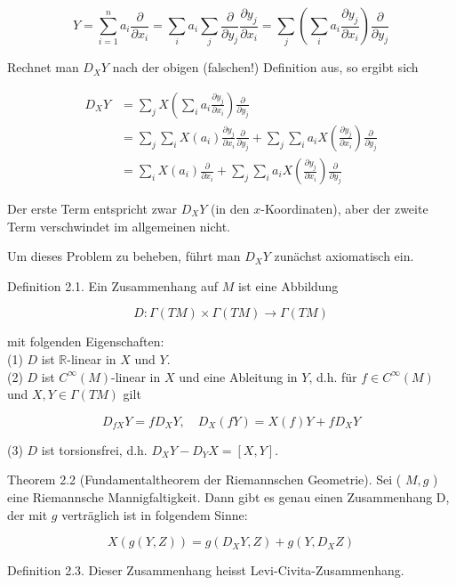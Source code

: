 \documentclass[10pt]{article}
\begin{document}
$$
Y=\sum_{i=1}^{n} a_{i} \frac{\partial}{\partial x_{i}}=\sum_{i} a_{i} \sum_{j} \frac{\partial}{\partial y_{j}} \frac{\partial y_{j}}{\partial x_{i}}=\sum_{j}\left(\sum_{i} a_{i} \frac{\partial y_{j}}{\partial x_{i}}\right) \frac{\partial}{\partial y_{j}}
$$

Rechnet man $D_{X} Y$ nach der obigen (falschen!) Definition aus, so ergibt sich

$$
\begin{aligned}
D_{X} Y & =\sum_{j} X\left(\sum_{i} a_{i} \frac{\partial y_{j}}{\partial x_{i}}\right) \frac{\partial}{\partial y_{j}} \\
& =\sum_{j} \sum_{i} X\left(a_{i}\right) \frac{\partial y_{j}}{\partial x_{i}} \frac{\partial}{\partial y_{j}}+\sum_{j} \sum_{i} a_{i} X\left(\frac{\partial y_{j}}{\partial x_{i}}\right) \frac{\partial}{\partial y_{j}} \\
& =\sum_{i} X\left(a_{i}\right) \frac{\partial}{\partial x_{i}}+\sum_{j} \sum_{i} a_{i} X\left(\frac{\partial y_{j}}{\partial x_{i}}\right) \frac{\partial}{\partial y_{j}}
\end{aligned}
$$

Der erste Term entspricht zwar $D_{X} Y$ (in den $x$-Koordinaten), aber der zweite Term verschwindet im allgemeinen nicht.

Um dieses Problem zu beheben, führt man $D_{X} Y$ zunächst axiomatisch ein.

Definition 2.1. Ein Zusammenhang auf $M$ ist eine Abbildung

$$
D: \Gamma(T M) \times \Gamma(T M) \rightarrow \Gamma(T M)
$$

mit folgenden Eigenschaften:\\
(1) $D$ ist $\mathbb{R}$-linear in $X$ und $Y$.\\
(2) $D$ ist $C^{\infty}(M)$-linear in $X$ und eine Ableitung in $Y$, d.h. für $f \in C^{\infty}(M)$ und $X, Y \in \Gamma(T M)$ gilt

$$
D_{f X} Y=f D_{X} Y, \quad D_{X}(f Y)=X(f) Y+f D_{X} Y
$$

(3) $D$ ist torsionsfrei, d.h. $D_{X} Y-D_{Y} X=[X, Y]$.

Theorem 2.2 (Fundamentaltheorem der Riemannschen Geometrie). Sei ( $M, g$ ) eine Riemannsche Mannigfaltigkeit. Dann gibt es genau einen Zusammenhang D, der mit $g$ verträglich ist in folgendem Sinne:

$$
X(g(Y, Z))=g\left(D_{X} Y, Z\right)+g\left(Y, D_{X} Z\right)
$$

Definition 2.3. Dieser Zusammenhang heisst Levi-Civita-Zusammenhang.
\end{document}
